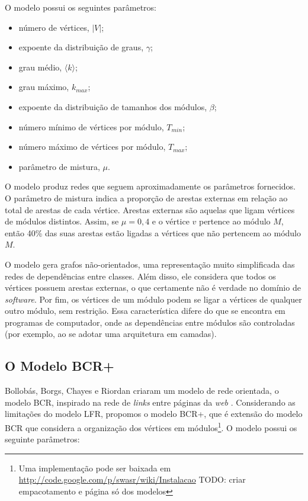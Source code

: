 \documentclass{acm_proc_article-sp}
\begin{document}
O modelo possui os seguintes parâmetros:
\begin{itemize}
  \item número de vértices, $|V|$;
  \item expoente da distribuição de graus, $\gamma$;
  \item grau médio, $\langle k \rangle$;
  \item grau máximo, $k_{max}$;
  \item expoente da distribuição de tamanhos dos módulos, $\beta$;
  \item número mínimo de vértices por módulo, $T_{min}$;
  \item número máximo de vértices por módulo, $T_{max}$;
  \item parâmetro de mistura, $\mu$.
\end{itemize}

O modelo produz redes que seguem aproximadamente os parâmetros fornecidos. O parâmetro de mistura indica a proporção de arestas externas em relação ao total de arestas de cada vértice. Arestas externas são aquelas que ligam vértices de módulos distintos. Assim, se $\mu = 0,4$ e o vértice $v$ pertence ao módulo $M$, então 40\% das suas arestas estão ligadas a vértices que não pertencem ao módulo $M$.


  O modelo gera grafos não-orientados, uma representação muito simplificada das redes de dependências entre classes. Além disso, ele considera que todos os vértices possuem arestas externas, o que certamente não é verdade no domínio de \emph{software}. Por fim, os vértices de um módulo podem se ligar a vértices de qualquer outro módulo, sem restrição. Essa característica difere do que se encontra em programas de computador, onde as dependências entre módulos são controladas (por exemplo, ao se adotar uma arquitetura em camadas).

\subsection{O Modelo BCR+}

Bollobás, Borgs, Chayes e Riordan criaram um modelo de rede orientada, o modelo BCR, inspirado na rede de \emph{links} entre páginas da \emph{web} \cite{Bollobas2003}. Considerando as limitações do modelo LFR, propomos o modelo BCR+, que é extensão do modelo BCR que considera a organização dos vértices em módulos\footnote{Uma implementação pode ser baixada em \url{http://code.google.com/p/swasr/wiki/Instalacao} TODO: criar empacotamento e página só dos modelos}. O modelo possui os seguinte parâmetros:
\end{document}
